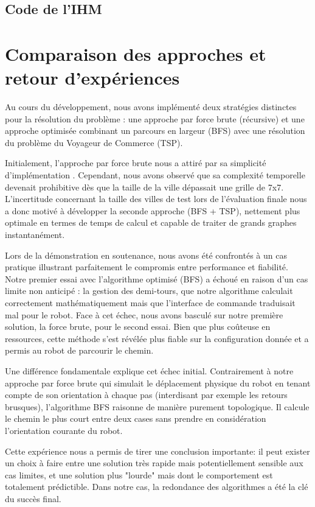 \subsection{Code de l'IHM}



\section {Comparaison des approches et retour d'expériences}
Au cours du développement, nous avons implémenté deux stratégies distinctes pour la résolution du problème : une approche par force brute (récursive) et une approche optimisée combinant un parcours en largeur (BFS) avec une résolution du problème du Voyageur de Commerce (TSP).

Initialement, l'approche par force brute nous a attiré par sa simplicité d'implémentation . Cependant, nous avons observé que sa complexité temporelle devenait prohibitive dès que la taille de la ville dépassait une grille de 7x7. L'incertitude concernant la taille des villes de test lors de l'évaluation finale nous a donc motivé à développer la seconde approche (BFS + TSP), nettement plus optimale en termes de temps de calcul et capable de traiter de grands graphes instantanément.

Lors de la démonstration en soutenance, nous avons été confrontés à un cas pratique illustrant parfaitement le compromis entre performance et fiabilité. Notre premier essai avec l'algorithme optimisé (BFS) a échoué en raison d'un cas limite non anticipé : la gestion des demi-tours, que notre algorithme calculait correctement mathématiquement mais que l'interface de commande traduisait mal pour le robot. Face à cet échec, nous avons basculé sur notre première solution, la force brute, pour le second essai. Bien que plus coûteuse en ressources, cette méthode s'est révélée plus fiable sur la configuration donnée et a permis au robot de parcourir le chemin.

Une différence fondamentale explique cet échec initial. Contrairement à notre approche par force brute qui simulait le déplacement physique du robot en tenant compte de son orientation à chaque pas (interdisant par exemple les retours brusques), l'algorithme BFS raisonne de manière purement topologique. Il calcule le chemin le plus court entre deux cases sans prendre en considération l'orientation courante du robot.

Cette expérience nous a permis de tirer une conclusion importante: il peut exister un choix à faire entre une solution très rapide mais potentiellement sensible aux cas limites, et une solution plus "lourde" mais dont le comportement est totalement prédictible. Dans notre cas, la redondance des algorithmes a été la clé du succès final.